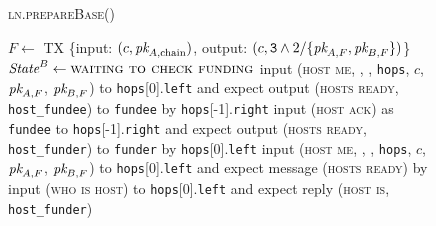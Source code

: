 \begin{figure}[H]
  \begin{processbox}{\textsc{ln.prepareBase}()}
    \begin{algorithmic}[1]
       
        \State $F \gets$ TX \{input: $(c, \textit{pk}_{A, \mathrm{chain}})$, output: $(c,
        \texttt{3} \wedge 2/\{\textit{pk}_{A, F}, \textit{pk}_{B, F}\})$\}
        \label{code:ln:base:create-funding}
          \State $\textit{State}^B \gets \textsc{waiting to check funding}$
        \EndIf
      \Else \: 
          \State input (\textsc{host me}, \alice, \bob, \texttt{hops}, $c$,
          $\textit{pk}_{A, F}$, $\textit{pk}_{B, F}$) to \texttt{hops}[0].\texttt{left} and expect
          output (\textsc{hosts ready}, \texttt{host\_fundee}) to
          \texttt{fundee} by \texttt{hops}[-1].\texttt{right} 
          \State input (\textsc{host ack}) as \texttt{fundee} to
          \texttt{hops}[-1].\texttt{right} and expect output (\textsc{hosts
          ready}, \texttt{host\_funder}) to \texttt{funder} by
          \texttt{hops}[0].\texttt{left}  
        \Else \: 
          \State input (\textsc{host me}, \alice, \bob, \texttt{hops}, $c$,
          $\textit{pk}_{A, F}$, $\textit{pk}_{B, F}$) to \texttt{hops}[0].\texttt{left} and expect
          message (\textsc{hosts ready}) by \bob {}
          \State input (\textsc{who is host}) to \texttt{hops}[0].\texttt{left}
          and expect reply (\textsc{host is}, \texttt{host\_funder})
        \EndIf
      \EndIf
    \end{algorithmic}
  \end{processbox}
  \caption{}
  \label{code:ln:prepare-base}
\end{figure}

